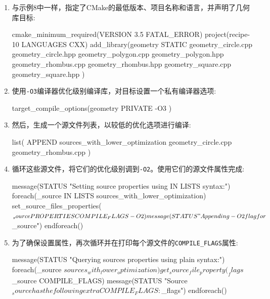 \begin{enumerate}
\item 与示例8中一样，指定了CMake的最低版本、项目名称和语言，并声明了几何库目标:

\begin{codebox}[cmake]
cmake_minimum_required(VERSION 3.5 FATAL_ERROR)
project(recipe-10 LANGUAGES CXX)
add_library(geometry
  STATIC
    geometry_circle.cpp
    geometry_circle.hpp
    geometry_polygon.cpp
    geometry_polygon.hpp
    geometry_rhombus.cpp
    geometry_rhombus.hpp
    geometry_square.cpp
    geometry_square.hpp
  )
\end{codebox}

\item 使用\texttt{-O3}编译器优化级别编译库，对目标设置一个私有编译器选项:

\begin{codebox}[cmake]
target_compile_options(geometry
  PRIVATE
    -O3
  )
\end{codebox}

\item 然后，生成一个源文件列表，以较低的优化选项进行编译:

\begin{codebox}[cmake]
list(
  APPEND sources_with_lower_optimization
    geometry_circle.cpp
    geometry_rhombus.cpp
  )
\end{codebox}

\item 循环这些源文件，将它们的优化级别调到\texttt{-O2}。使用它们的源文件属性完成:

\begin{codebox}[cmake]
message(STATUS "Setting source properties using IN LISTS syntax:")
foreach(_source IN LISTS sources_with_lower_optimization)
  set_source_files_properties(${_source} PROPERTIES COMPILE_FLAGS -O2)
  message(STATUS "Appending -O2 flag for ${_source}")
endforeach()
\end{codebox}

\item 为了确保设置属性，再次循环并在打印每个源文件的\texttt{COMPILE\_FLAGS}属性:

\begin{codebox}[cmake]
message(STATUS "Querying sources properties using plain syntax:")
foreach(_source ${sources_with_lower_optimization})
  get_source_file_property(_flags ${_source} COMPILE_FLAGS)
  message(STATUS "Source ${_source} has the following extra COMPILE_FLAGS: ${_flags}")
endforeach()
\end{codebox}


\end{enumerate}
